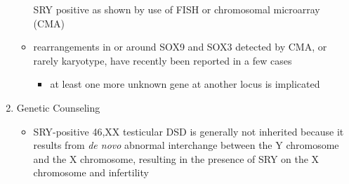 \documentclass[12pt]{scrartcl}
\begin{document}
\begin{enumerate}
\begin{itemize}
SRY positive as shown by use of FISH or chromosomal microarray (CMA)
\item rearrangements in or around SOX9 and SOX3 detected by CMA, or rarely
karyotype, have recently been reported in a few cases
\begin{itemize}
\item at least one more unknown gene at another locus is implicated
\end{itemize}
\end{itemize}
\item Genetic Counseling
\label{sec:org2f19186}
\begin{itemize}
\item SRY-positive 46,XX testicular DSD is generally not inherited because
it results from \emph{de novo} abnormal interchange between the Y
chromosome and the X chromosome, resulting in the presence of SRY on
the X chromosome and infertility
\end{itemize}
\end{enumerate}
\end{document}
